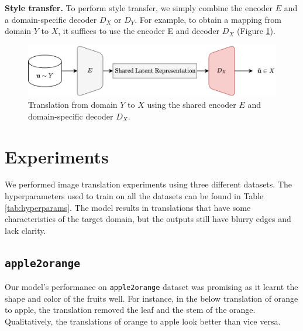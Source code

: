 \documentclass{article}
\begin{document}
    

\textbf{Style transfer.} To perform style transfer, we simply combine the encoder $E$ and a domain-specific decoder $D_X$ or $D_Y$. For example, to obtain a mapping from domain $Y$ to $X$, it suffices to use the encoder E and decoder $D_X$ (Figure \ref{fig:eval}).

\begin{figure}
  \centering
  \includegraphics[width=0.7\linewidth]{report/assets/eval.png}
  \caption{Translation from domain $Y$ to $X$ using the shared encoder $E$ and domain-specific decoder $D_X$.}
  \label{fig:eval}
\end{figure}

\section{Experiments}
We performed image translation experiments using three different datasets. The hyperparameters used to train on all the datasets can be found in Table \ref{tab:hyperparams}. The model results in translations that have some characteristics of the target domain, but the outputs still have blurry edges and lack clarity.
\subsection{\texttt{apple2orange}}
Our model's performance on \texttt{apple2orange} dataset was promising as it learnt the shape and color of the fruits well. For instance, in the below translation of orange to apple, the translation removed the leaf and the stem of the orange. Qualitatively, the translations of orange to apple look better than vice versa.
\end{document}
